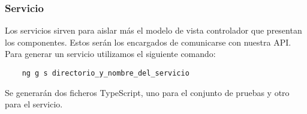 \subsubsection{Servicio}
Los servicios sirven para aislar más el modelo de vista controlador que presentan los componentes. Estos serán los encargados de comunicarse con nuestra API.
\\Para generar un servicio utilizamos el siguiente comando:
\begin{verbatim}
    ng g s directorio_y_nombre_del_servicio
\end{verbatim}
Se generarán dos ficheros TypeScript, uno para el conjunto de pruebas y otro para el servicio.